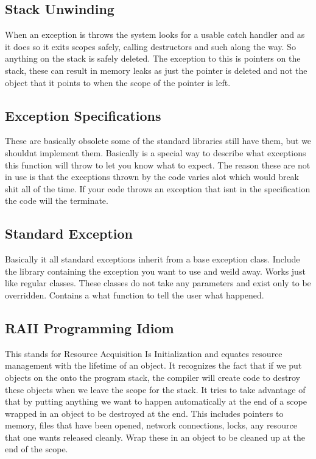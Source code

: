 \documentclass[12pt]{article}
\begin{document}
\subsection*{Stack Unwinding}
When an exception is throws the system looks for a usable catch handler and as it does so it exits scopes safely, calling destructors and such along the way. So anything on the stack is safely deleted. The exception to this is pointers on the stack, these can result in memory leaks as just the pointer is deleted and not the object that it points to when the scope of the pointer is left.

\subsection*{Exception Specifications}
These are basically obsolete some of the standard libraries still have them, but we shouldnt implement them. Basically is a special way to describe what exceptions this function will throw to let you know what to expect. The reason these are not in use is that the exceptions thrown by the code varies alot which would break shit all of the time. If your code throws an exception that isnt in the specification the code will the terminate.

\subsection*{Standard Exception}
Basically it all standard exceptions inherit from a base exception class. Include the library containing the exception you want to use and weild away. Works just like regular classes. These classes do not take any parameters and exist only to be overridden. Contains a what function to tell the user what happened.

\subsection{RAII Programming Idiom}
This stands for Resource Acquisition Is Initialization and equates resource management with the lifetime of an object. It recognizes the fact that if we put objects on the onto the program stack, the compiler will create code to destroy these objects when we leave the scope for the stack. It tries to take advantage of that by putting anything we want to happen automatically at the end of a scope wrapped in an object to be destroyed at the end. This includes pointers to memory, files that have been opened, network connections, locks, any resource that one wants released cleanly. Wrap these in an object to be cleaned up at the end of the scope.
\end{document}
